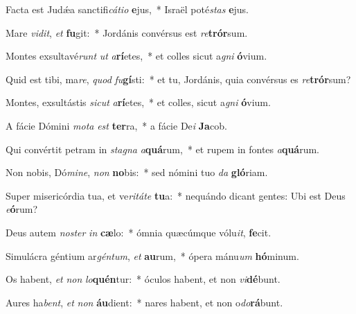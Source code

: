 ﻿\item Facta est Judǽa sanctifi\textit{cá}\textit{ti}\textit{o} \textbf{e}jus,~* Israël poté\textit{stas} \textbf{e}jus.

\item Mare \textit{vi}\textit{dit}, \textit{et} \textbf{fu}git:~* Jordánis convérsus est \textit{re}\textbf{trór}sum.

\item Montes exsultavé\textit{runt} \textit{ut} \textit{a}\textbf{rí}etes,~* et colles sicut a\textit{gni} \textbf{ó}vium.

\item Quid est tibi, ma\textit{re}, \textit{quod} \textit{fu}\textbf{gí}sti:~* et tu, Jordánis, quia convérsus es \textit{re}\textbf{trór}sum?

\item Montes, exsultástis \textit{si}\textit{cut} \textit{a}\textbf{rí}etes,~* et colles, sicut a\textit{gni} \textbf{ó}vium.

\item A fácie Dómini \textit{mo}\textit{ta} \textit{est} \textbf{ter}ra,~* a fácie De\textit{i} \textbf{Ja}cob.

\item Qui convértit petram in \textit{sta}\textit{gna} \textit{a}\textbf{quá}rum,~* et rupem in fontes \textit{a}\textbf{quá}rum.

\item Non nobis, Dó\textit{mi}\textit{ne}, \textit{non} \textbf{no}bis:~* sed nómini tuo \textit{da} \textbf{gló}riam.

\item Super misericórdia tua, et ve\textit{ri}\textit{tá}\textit{te} \textbf{tu}a:~* nequándo dicant gentes: Ubi est Deus \textit{e}\textbf{ó}rum?

\item Deus autem \textit{no}\textit{ster} \textit{in} \textbf{cæ}lo:~* ómnia quæcúmque vólu\textit{it}, \textbf{fe}cit.

\item Simulácra géntium ar\textit{gén}\textit{tum}, \textit{et} \textbf{au}rum,~* ópera mánu\textit{um} \textbf{hó}minum.

\item Os habent, \textit{et} \textit{non} \textit{lo}\textbf{quén}tur:~* óculos habent, et non \textit{vi}\textbf{dé}bunt.

\item Aures ha\textit{bent}, \textit{et} \textit{non} \textbf{áu}dient:~* nares habent, et non o\textit{do}\textbf{rá}bunt.

